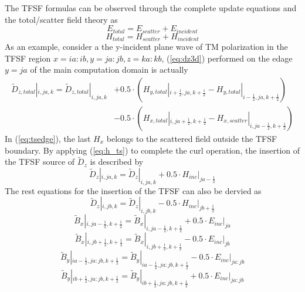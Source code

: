 The TFSF formulas can be observed through the complete update equations and the totol/scatter field theory as
\begin{equation}\label{eq:e_ts}
  E_{total}=E_{scatter}+E_{incident}
\end{equation}
\begin{equation}\label{eq:h_ts}
  H_{total}=H_{scatter}+H_{incident}  
\end{equation}
As an example, consider a the y-incident plane wave of TM polarization in the TFSF region $x=ia:ib, y=ja:jb, z=ka:kb$,
(\ref{eq:dz3d}) performed on the edage $y=ja$ of the main computation domain is actually
\begin{equation}\label{eq:tsedge}
  \begin{split}
    \widetilde{D}_{z,total}|_{i,ja,k} = \widetilde{D}_{z,total}|_{i,ja,k} &+ 0.5 \cdot \left( H_{y,total}|_{i+\frac{1}{2},ja,k+\frac{1}{2}} - H_{y,total}|_{i-\frac{1}{2},ja,k+\frac{1}{2}} \right) \\
    &- 0.5 \cdot \left( H_{x,total}|_{i,ja+\frac{1}{2},k+\frac{1}{2}} - H_{x,scatter}|_{i,ja-\frac{1}{2},k+\frac{1}{2}} \right)    
  \end{split}
\end{equation}
In (\ref{eq:tsedge}), the last $H_x$ belongs to the scattered field outside the TFSF boundary. By applying
(\ref{eq:h_ts}) to complete the curl operation, the insertion of the TFSF source of $\widetilde{D}_z$ is described by
\begin{displaymath}
  \widetilde{D}_z|_{i,ja,k} = \widetilde{D}_z|_{i,ja,k} + 0.5 \cdot H_{inc}|_{ja-\frac{1}{2}}
\end{displaymath}
The rest equations for the insertion of the TFSF can also be dervied as
\begin{displaymath}
  \widetilde{D}_z|_{i,jb,k} = \widetilde{D}_z|_{i,jb,k} - 0.5 \cdot H_{inc}|_{jb+\frac{1}{2}}  
\end{displaymath}
\begin{displaymath}
  \widetilde{B}_x|_{i,ja-\frac{1}{2},k+\frac{1}{2}}=\widetilde{B}_x|_{i,ja-\frac{1}{2},k+\frac{1}{2}}+0.5 \cdot E_{inc}|_{ja}
\end{displaymath}
\begin{displaymath}
  \widetilde{B}_x|_{i,jb+\frac{1}{2},k+\frac{1}{2}}=\widetilde{B}_x|_{i,jb+\frac{1}{2},k+\frac{1}{2}}-0.5 \cdot E_{inc}|_{jb}
\end{displaymath}
\begin{displaymath}
  \widetilde{B}_y|_{ia-\frac{1}{2},ja:jb,k+\frac{1}{2}}=\widetilde{B}_y|_{ia-\frac{1}{2},ja:jb,k+\frac{1}{2}}-0.5 \cdot E_{inc}|_{ja:jb}
\end{displaymath}
\begin{displaymath}
  \widetilde{B}_y|_{ib+\frac{1}{2},ja:jb,k+\frac{1}{2}}=\widetilde{B}_y|_{ib+\frac{1}{2},ja:jb,k+\frac{1}{2}}+0.5 \cdot E_{inc}|_{ja:jb}
\end{displaymath}






